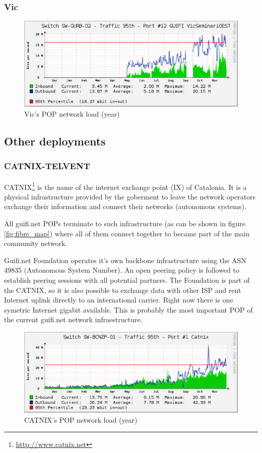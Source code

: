 \subsubsection{Vic}

\begin{figure}[htbp]
  \centering
  \includegraphics[scale=.65]{sect3/figures/vic_network_load_year.eps} 
  \caption{Vic's POP network load (year)}
  \label{fig:vic_net_load}
\end{figure}



\subsection{Other deployments}

\subsubsection{CATNIX-TELVENT}

\bigskip 

CATNIX\footnote{\url{http://www.catnix.net}} is the name of the internet exchange point (IX) of Catalonia. 
It is a physical infrastructure provided by the goberment to leave the network operators exchange their 
information and connect their networks (autonomous systems). 

\medskip
All guifi.net POPs terminate to such infrastructure (as can be shown in figure \ref{fig:fibre_map}) where
all of them connect together to became part of the main community network. 

\medskip
Guifi.net Foundation operates it's own backbone infrastructure using the ASN 49835 (Autonomous System Number). 
An open peering policy is followed to establish peering sessions with all potential partners.
The Foundation is part of the CATNIX, so it is also possible to exchange data with other ISP and
rent Internet uplink directly to an international carrier. Right now there is one symetric Internet gigabit 
available. 
\newline
This is probably the most important POP of the current guifi.net network infraestructure.


\begin{figure}[htbp]
  \centering
  \includegraphics[scale=.65]{sect3/figures/catnix_network_load_year.eps} 
  \caption{CATNIX's POP network load (year)}
  \label{fig:vic_net_load}
\end{figure}



